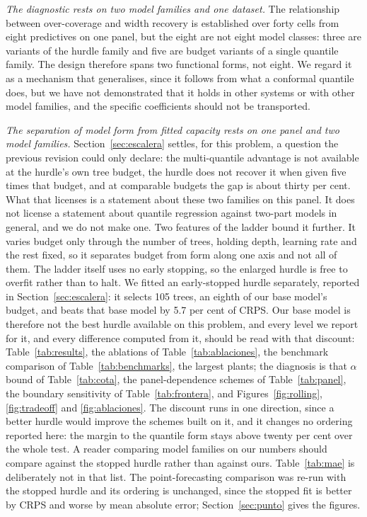 \documentclass[preprint,3p,times]{elsarticle}
\providecommand{\DIFaddtex}[1]{{\protect\color{blue} \sf #1}} %
\providecommand{\DIFdeltex}[1]{{\protect\color{red} \scriptsize #1}} %
\providecommand{\DIFaddbegin}{} %
\providecommand{\DIFaddend}{} %
\providecommand{\DIFdelbegin}{} %
\providecommand{\DIFdelend}{} %
\providecommand{\DIFadd}[1]{\texorpdfstring{\DIFaddtex{#1}}{#1}} %
\providecommand{\DIFdel}[1]{\texorpdfstring{\DIFdeltex{#1}}{}} %
\begin{document}
\DIFadd{\emph{The diagnostic rests on two model families and one dataset.} The relationship between over-coverage and width recovery is established over forty cells from eight predictives on one panel, but the eight are not eight model classes: three are variants of the hurdle family and five are budget variants of a single quantile family. The design therefore spans two functional forms, not eight. We regard it as a mechanism that generalises, since it follows from what a conformal quantile does, but we have not demonstrated that it holds in other systems or with other model families, and the specific coefficients should not be transported.
}

\DIFadd{\emph{The separation of model form from fitted capacity rests on one panel and two model families.} Section~\ref{sec:escalera} settles, for this problem, a question the previous revision could only declare: the multi-quantile advantage is not available at the hurdle's own tree budget, the hurdle does not recover it when given five times that budget, and at comparable budgets the gap is about thirty per cent. What that licenses is a statement about these two families on this panel. It does not license a statement about quantile regression against two-part models in general, and we do not make one. Two features of the ladder bound it further. It varies budget only through the number of trees, holding depth, learning rate and the rest fixed, so it separates budget from form along one axis and not all of them. The ladder itself uses no early stopping, so the enlarged hurdle is free to overfit rather than to halt. We fitted an early-stopped hurdle separately, reported in Section~\ref{sec:escalera}: it selects 105 trees, an eighth of our base model's budget, and beats that base model by 5.7 per cent of CRPS. Our base model is therefore not the best hurdle available on this problem, and every level we report for it, and every difference computed from it, should be read with that discount: Table~\ref{tab:results}, the ablations of Table~\ref{tab:ablaciones}, the benchmark comparison of Table~\ref{tab:benchmarks}, }\DIFaddend the \DIFdelbegin \DIFdel{largest plants; the diagnosis is that }\DIFdelend \DIFaddbegin \DIFadd{$\alpha$ bound of Table~\ref{tab:cota}, the panel-dependence schemes of Table~\ref{tab:panel}, the boundary sensitivity of Table~\ref{tab:frontera}, and Figures~\ref{fig:rolling}, \ref{fig:tradeoff} and \ref{fig:ablaciones}. The discount runs in one direction, since a better hurdle would improve the schemes built on it, and it changes no ordering reported here: the margin to the quantile form stays above twenty per cent over the whole test. A reader comparing model families on our numbers should compare against the stopped hurdle rather than against ours. Table~\ref{tab:mae} is deliberately not in that list. The point-forecasting comparison was re-run with the stopped hurdle and its ordering is unchanged, since the stopped fit is better by CRPS and worse by mean absolute error; Section~\ref{sec:punto} gives the figures.
}
\end{document}
